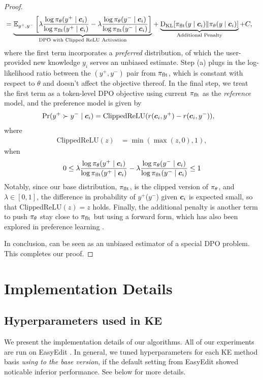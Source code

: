 \begin{proof}
\begin{align*}
&= 
{\underbrace{\mathbb{E}_{y^+, y^-}\left [ \lambda \frac{\log \pi_\theta (y^+ \mid {\boldsymbol{c}}_i)}{\log \pi_\text{flt} (y^+ \mid {\boldsymbol{c}}_i)} - \lambda \frac{\log \pi_\theta(y^- \mid {\boldsymbol{c}}_i) }{\log \pi_\text{flt}(y^- \mid {\boldsymbol{c}}_i)} \right ]}_{\text{DPO with Clipped ReLU Activation}}} 
+ 
\underbrace{\text{D}_\text{KL} [\pi_\text{flt}(y \mid {\boldsymbol{c}}_i) \| \pi_\theta (y \mid {\boldsymbol{c}}_i)]}_{\text{Additional Penalty}} + C,
\end{align*}
where the first term incorporates a \textit{preferred} distribution, of which the user-provided new knowledge $y_i$ serves an unbiased estimate.
Step (a) plugs in the log-likelihood ratio between the $(y^+, y^-)$ pair from $\pi_\text{flt}$, which is constant with respect to $\theta$ and doesn't affect the objective thereof. 
In the final step, we treat the first term as a token-level DPO objective using current $\pi_\text{flt}$ as the \textit{reference} model, and the preference model is given by
\begin{align*}
\text{Pr} (y^+ \succ y^- \mid {\boldsymbol{c}}_i) 
&= \text{ClippedReLU}(r({\boldsymbol{c}}_i, y^+) - r({\boldsymbol{c}}_i, y^-)),
\end{align*}
where
\begin{align*}    
\text{ClippedReLU}(z) &= \min(\max(z, 0), 1),
\end{align*}
when 
\begin{align*}
0 \leq \lambda \frac{\log \pi_\theta (y^+ \mid {\boldsymbol{c}}_i)}{\log \pi_\text{flt} (y^+ \mid {\boldsymbol{c}}_i)} - \lambda \frac{\log \pi_\theta(y^- \mid {\boldsymbol{c}}_i) }{\log \pi_\text{flt}(y^- \mid {\boldsymbol{c}}_i)} \leq 1
\end{align*}
Notably, since our base distribution, $\pi_\text{flt}$, is the clipped version of $\pi_\theta$, and $\lambda \in [0, 1]$, the difference in probability of $y^+$($y^-$) given ${\boldsymbol{c}}_i$ is expected small, so that $\text{ClippedReLU}(z) = z$ holds. 
Finally, the additional penalty is another term to push $\pi_\theta$ stay close to $\pi_\text{flt}$ but using a forward form, which has also been explored in preference learning \citep{wang2024beyond}.  

In conclusion, 
{\NAME} can be seen as an unbiased estimator of a special DPO problem. This completes our proof. 
\end{proof}






\section{Implementation Details}
\label{app:implementation}

\subsection{Hyperparameters used in KE}
We present the implementation details of our algorithms.
All of our experiments are run on EasyEdit \citep{wang2024easyedit}. 
In general, we tuned hyperparameters for each KE method basis \textit{using to the base version}, if the default setting from EasyEdit showed noticable inferior performance.
See below for more details.


